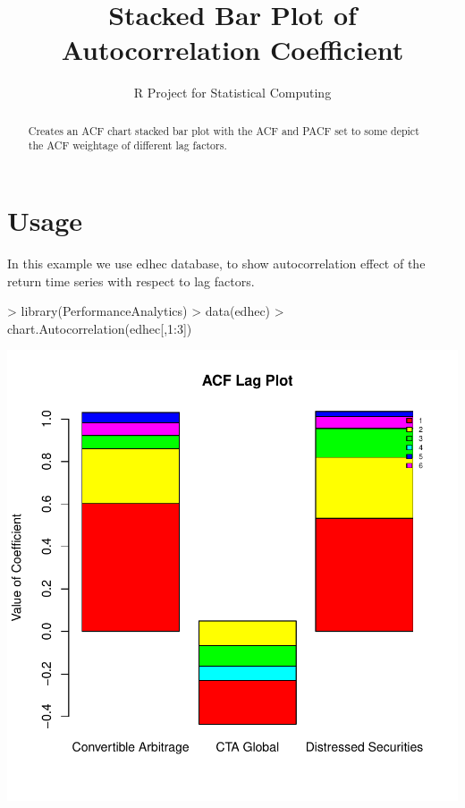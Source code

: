 \documentclass[12pt,letterpaper,english]{article}
\title{Stacked Bar Plot of Autocorrelation Coefficient}
\author{R Project for Statistical Computing}
\begin{document}


\maketitle


\begin{abstract}
Creates an ACF chart stacked bar plot with the ACF and PACF set to some depict the ACF weightage of different lag factors.
\end{abstract}



\section{Usage}

In this example we use edhec database, to show autocorrelation effect of the return time series with respect to lag factors.

\begin{Schunk}
\begin{Sinput}
> library(PerformanceAnalytics)
> data(edhec)
> chart.Autocorrelation(edhec[,1:3])
\end{Sinput}
\end{Schunk}
\includegraphics{ACFbarplot-003}
\end{document}
